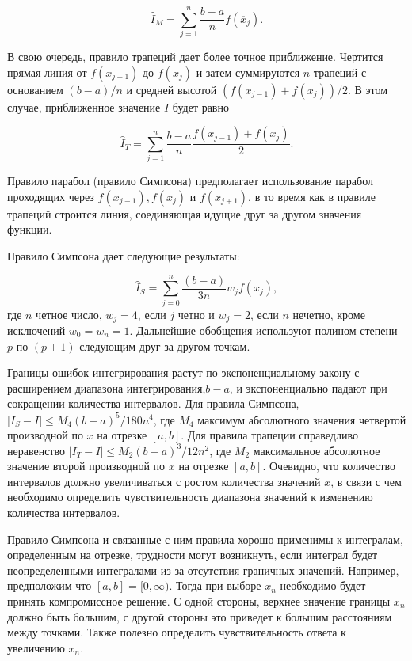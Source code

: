 \begin{equation}
\hat{I}_M=\sum^{n}_{j=1}\dfrac{b-a}{n}f(\overline{x}_j).
\end{equation}

В свою очередь, правило трапеций дает более точное приближение. Чертится прямая линия от $f(x_{j-1})$ до $f(x_j)$ и затем суммируются $n$ трапеций с основанием $(b-a)/n$  и средней высотой $(f(x_{j-1})+f(x_j))/2$. В этом случае, приближенное значение $I$ будет равно 

\begin{equation}
\hat{I}_T=\sum^{n}_{j=1}\dfrac{b-a}{n}\dfrac{f(x_{j-1})+f(x_j)}{2}.
\end{equation}

Правило парабол (правило Симпсона) предполагает использование парабол проходящих через $f(x_{j-1}), f(x_j)$ и $f(x_{j+1})$, в то время как в правиле трапеций строится линия, соединяющая идущие друг за другом значения функции. 

Правило Симпсона дает следующие результаты:

\begin{equation}
\hat{I}_S=\sum^{n}_{j=0}\dfrac{(b-a)}{3n}w_{j}f(x_j),
\end{equation}
где $n$ четное число, $w_j=4$, если $j$ четно и $w_j=2$, если $n$ нечетно, кроме исключений $w_0=w_n=1$. Дальнейшие обобщения используют полином степени $p$ по $(p+1)$ следующим друг за другом точкам.

Границы ошибок интегрирования растут по экспоненциальному закону с расширением диапазона интегрирования,$b-a$, и экспоненциально падают при сокращении количества интервалов. Для правила Симпсона, $|I_S-I|\leq M_{4}(b-a)^{5}/180n^4$, где $M_4$ максимум абсолютного значения четвертой производной по $x$ на отрезке $[a,b]$. Для правила трапеции справедливо неравенство $|I_T-I|\leq M_{2}(b-a)^{3}/12n^2$, где $M_2$ максимальное абсолютное значение второй производной по $x$ на отрезке $[a,b]$. Очевидно, что количество интервалов должно увеличиваться с ростом количества значений $x$, в связи с чем необходимо определить чувствительность диапазона значений к изменению количества интервалов.

Правило Симпсона и связанные с ним правила хорошо применимы к интегралам, определенным на отрезке, трудности могут возникнуть, если интеграл будет неопределенными интегралами из-за отсутствия граничных значений. Например, предположим что $[a,b]=[0,\infty)$. Тогда при выборе $x_n$ необходимо будет принять компромиссное решение. С одной стороны, верхнее значение границы $x_n$ должно быть большим, с другой стороны это приведет к большим расстояниям между точками. Также полезно определить чувствительность ответа к увеличению $x_n$.

